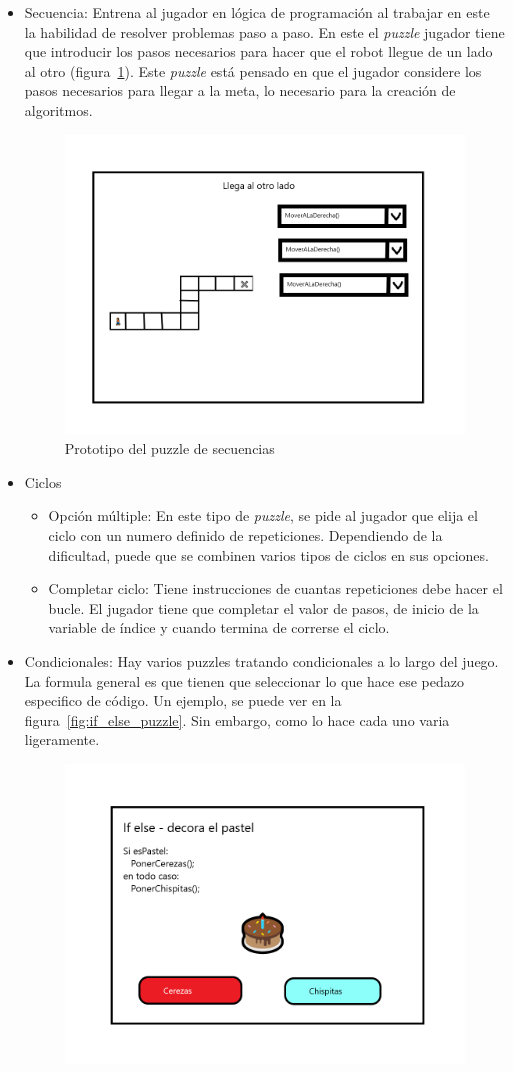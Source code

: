\begin{itemize}
    \item Secuencia: Entrena al jugador en lógica de programación al trabajar en este la habilidad de resolver problemas paso a paso. En este el \textit{puzzle} jugador tiene que introducir los pasos necesarios para hacer que el robot llegue de un lado al otro (figura~\ref{fig:puzzle_secuencia}). Este \textit{puzzle} está pensado en que el jugador considere los pasos necesarios para llegar a la meta, lo necesario para la creación de algoritmos.
    \begin{figure}[H]
        \centering
        \includegraphics[width=0.5\linewidth]{images/PuzzleSecuencia.png}
        \caption{Prototipo del puzzle de secuencias}
        \label{fig:puzzle_secuencia}
    \end{figure}
    \item Ciclos
    \begin{itemize}
        \item Opción múltiple: En este tipo de \textit{puzzle}, se pide al jugador que elija el ciclo con un numero definido de repeticiones. Dependiendo de la dificultad, puede que se combinen varios tipos de ciclos en sus opciones. 
        \item Completar ciclo: Tiene instrucciones de cuantas repeticiones debe hacer el bucle. El jugador tiene que completar el valor de pasos, de inicio de la variable de índice y cuando termina de correrse el ciclo.
    \end{itemize}
    \item Condicionales: Hay varios puzzles tratando condicionales a lo largo del juego. La formula general es que tienen que seleccionar lo que hace ese pedazo especifico de código. Un ejemplo, se puede ver en la figura~\ref{fig:if_else_puzzle}. Sin embargo, como lo hace cada uno varia ligeramente.
    \begin{figure}[H]
                \centering
                \includegraphics[width=0.5\linewidth]{images/PuzzleIfElse.png}

\end{figure}
\end{itemize}
